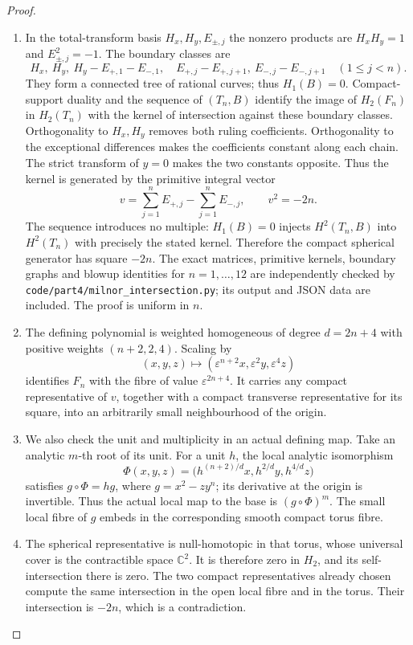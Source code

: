 \begin{proof}
\begin{enumerate}[label={$\langle1\rangle$\arabic*.},leftmargin=*]
\item In the total-transform basis $H_x,H_y,E_{\pm,j}$ the nonzero
products are $H_xH_y=1$ and $E_{\pm,j}^2=-1$. The boundary
classes are
\[
 H_x,\ H_y,\ H_y-E_{+,1}-E_{-,1},\quad
 E_{+,j}-E_{+,j+1},\ E_{-,j}-E_{-,j+1}\quad(1\leq j<n).
\]
They form a connected tree of rational curves; thus $H_1(B)=0$.
Compact-support duality and the sequence of $(T_n,B)$ identify
the image of $H_2(F_n)$ in $H_2(T_n)$ with the kernel of
intersection against these boundary classes. Orthogonality to
$H_x,H_y$ removes both ruling coefficients. Orthogonality to
the exceptional differences makes the coefficients constant
along each chain. The strict transform of $y=0$ makes the two
constants opposite. Thus the kernel is generated by the
primitive integral vector
\[
 v=\sum_{j=1}^n E_{+,j}-\sum_{j=1}^n E_{-,j},\qquad v^2=-2n.
\]
The sequence introduces no multiple: $H_1(B)=0$ injects
$H^2(T_n,B)$ into $H^2(T_n)$ with precisely the stated kernel.
Therefore the compact spherical generator has square $-2n$.
The exact matrices, primitive kernels, boundary graphs and
blowup identities for $n=1,\ldots,12$ are independently checked
by \texttt{code/part4/milnor\_intersection.py}; its output and
JSON data are included. The proof is uniform in $n$.

\item The defining polynomial is weighted homogeneous of degree
$d=2n+4$ with positive weights $(n+2,2,4)$. Scaling by
\[
 (x,y,z)\longmapsto
 (\varepsilon^{n+2}x,\varepsilon^2y,\varepsilon^4z)
\]
identifies $F_n$ with the fibre of value $\varepsilon^{2n+4}$.
It carries any compact representative of $v$, together with a
compact transverse representative for its square, into an
arbitrarily small neighbourhood of the origin.

\item We also check the unit and multiplicity in an actual defining
map. Take an analytic $m$-th root of its unit. For a unit $h$,
the local analytic isomorphism
\[
 \Phi(x,y,z)=
 \bigl(h^{(n+2)/d}x,h^{2/d}y,h^{4/d}z\bigr)
\]
satisfies $g\circ\Phi=hg$, where $g=x^2-zy^n$; its derivative
at the origin is invertible. Thus the actual local map to the
base is $(g\circ\Phi)^m$. The small local fibre of $g$ embeds
in the corresponding smooth compact torus fibre.

\item The spherical representative is null-homotopic in that torus,
whose universal cover is the contractible space $\mathbb C^2$.
It is therefore zero in $H_2$, and its self-intersection there
is zero. The two compact representatives already chosen compute
the same intersection in the open local fibre and in the torus.
Their intersection is $-2n$, which is a contradiction.

\end{enumerate}
\end{proof}
